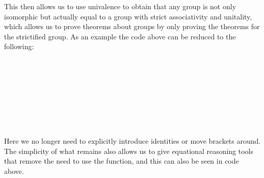 \documentclass{article}
\begin{document}
This then allows us to use univalence to obtain that any group is not only isomorphic but actually equal to a group with strict associativity and unitality, which allows us to prove theorems about groups by only proving the theorems for the strictified group. As an example the code above can be reduced to the following:
\begin{code}%
\>[0]\AgdaSpace{}%
\AgdaSymbol{:}\AgdaSpace{}%
\AgdaSpace{}%
\AgdaSymbol{\{}\AgdaSymbol{\}}\AgdaSpace{}%
\AgdaSymbol{(}\AgdaSpace{}%
\AgdaSymbol{:}\AgdaSpace{}%
\AgdaSpace{}%
\AgdaSymbol{)}\AgdaSpace{}%
\AgdaSpace{}%
\AgdaSpace{}%
\<%
\\
\>[0]\AgdaSpace{}%
\AgdaSpace{}%
\AgdaSymbol{=}\AgdaSpace{}%
\AgdaSpace{}%
\<%
\\
\>[0][@{}l@{\AgdaIndent{0}}]%
\>[2]%
\>[117I]\AgdaSpace{}%
\AgdaSpace{}%
\AgdaSpace{}%
\AgdaSpace{}%
\<%
\\
\>[.][@{}l@{}]\<[117I]%
\>[4]\AgdaSpace{}%
%
\>[21]\AgdaSpace{}%
\AgdaSpace{}%
\AgdaSpace{}%
\<%
\\
%
\>[4]\AgdaSpace{}%
\AgdaSpace{}%
\AgdaSpace{}%
\AgdaSpace{}%
\AgdaSpace{}%
\AgdaSpace{}%
%
\>[21]%
\>[25]%
\>[32]\<%
\\
%
\>[4]\AgdaSpace{}%
\AgdaSpace{}%
\<%
\\
%
\>[2]\<%
\\
\>[2][@{}l@{\AgdaIndent{0}}]%
\>[4]\AgdaSpace{}%
\AgdaSpace{}%
\AgdaSpace{}%
\<%
\end{code}
Here we no longer need to explicitly introduce identities or move brackets around. The simplicity of what remains also allows us to give equational reasoning tools that remove the need to use the  function, and this can also be seen in code above.
\end{document}

